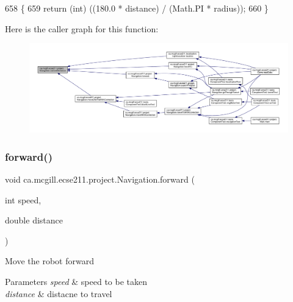 \begin{DoxyCode}
658                                                                     \{
659     \textcolor{keywordflow}{return} (\textcolor{keywordtype}{int}) ((180.0 * distance) / (Math.PI * radius));
660   \}
\end{DoxyCode}
Here is the caller graph for this function\+:
\nopagebreak
\begin{figure}[H]
\begin{center}
\leavevmode
\includegraphics[width=350pt]{classca_1_1mcgill_1_1ecse211_1_1project_1_1_navigation_ac9e260bcd619ffa4820d7d0de7ea1c12_icgraph}
\end{center}
\end{figure}
\mbox{\label{classca_1_1mcgill_1_1ecse211_1_1project_1_1_navigation_a7c66610c5b7496ddb35d342ab2cd3f08}} 
\subsubsection{\texorpdfstring{forward()}{forward()}}
{\footnotesize\ttfamily void ca.\+mcgill.\+ecse211.\+project.\+Navigation.\+forward (\begin{DoxyParamCaption}\item[{int}]{speed,  }\item[{double}]{distance }\end{DoxyParamCaption})}

Move the robot forward


\begin{DoxyParams}{Parameters}
{\em speed} & speed to be taken \\
\hline
{\em distance} & distacne to travel \\
\hline
\end{DoxyParams}


